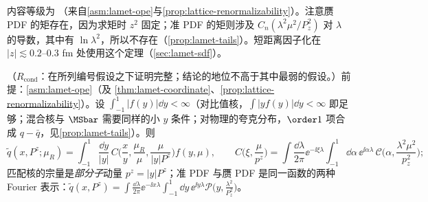 内容等级为 \tagA（来自\cref{asm:lamet-ope}与\cref{prop:lattice-renormalizability}）。注意赝 PDF 的矩存在，因为求矩时 $z^2$ 固定；准 PDF 的矩则涉及 $C_n(\lambda^2\mu^2/P_z^2)$ 对 $\lambda$ 的导数，其中有 $\ln\lambda^2$，所以不存在（\cref{prop:lamet-tails}）。短距离因子化在 $|z|\lesssim0.2$--$0.3$ fm 处使用这个定理（\cref{sec:lamet-sdf}）。

\begin{theorem}\label{thm:lamet-parton-momentum}
（$R_{\mathrm{cond}}$：在所列编号假设之下证明完整；结论的地位不高于其中最弱的假设。）前提：\cref{asm:lamet-ope}（及 \cref{thm:lamet-coordinate}、\cref{prop:lattice-renormalizability}）。设 $\int_{-1}^1|f(y)|\dd y<\infty$（对比值核，$\int|yf(y)|\dd y<\infty$ 即足够；混合核与 $\MSbar$ 需要同样的小 $y$ 条件；对物理的夸克分布，$\order1$ 项合成 $q-\bar q$，见\cref{prop:lamet-tails}）。则
\begin{equation}\label{eq:lamet-mom-fact}
\tilde q(x,P^z;\mu_R)=\int_{-1}^1\frac{\dd y}{|y|}\,C\Big(\frac xy,\frac{\mu_R}\mu,\frac\mu{|y|P^z}\Big)f(y,\mu),\qquad
C\Big(\xi,\frac\mu{p^z}\Big)=\int\frac{\dd\lambda}{2\pi}\ee^{-\ii\xi\lambda}\int_{-1}^1\dd\alpha\,\ee^{\ii\alpha\lambda}\,\mathcal C\Big(\alpha,\frac{\lambda^2\mu^2}{p_z^2}\Big);
\end{equation}%
匹配核的宗量是\emph{部分子}动量 $p^z=|y|P^z$；准 PDF 与赝 PDF 是同一函数的两种 Fourier 表示：$\tilde q(x,P^z)=\int\frac{\dd\lambda}{2\pi}\ee^{-\ii x\lambda}\int_{-1}^1\dd y\,\ee^{\ii y\lambda}\mathcal P\big(y,\frac{\lambda^2}{P_z^2}\big)$。
\end{theorem}

